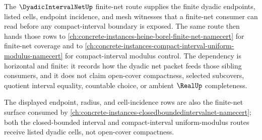 The $\DyadicIntervalNetUp$ finite-net route supplies the finite dyadic endpoints, listed cells, endpoint incidence, and mesh witnesses that a finite-net consumer can read before any compact-interval boundary is exposed. The same route then hands those rows to \autoref{ch:concrete-instances-heine-borel-finite-net-namecert} for finite-net coverage and to \autoref{ch:concrete-instances-compact-interval-uniform-modulus-namecert} for compact-interval modulus control. The dependency is horizontal and finite: it records how the dyadic net packet feeds those sibling consumers, and it does not claim open-cover compactness, selected subcovers, quotient interval equality, countable choice, or ambient $\RealUp$ completeness.

The displayed endpoint, radius, and cell-incidence rows are also the finite-net surface consumed by \autoref{ch:concrete-instances-closedboundedintervalnet-namecert}; both the closed-bounded interval and compact-interval uniform-modulus routes receive listed dyadic cells, not open-cover compactness.
